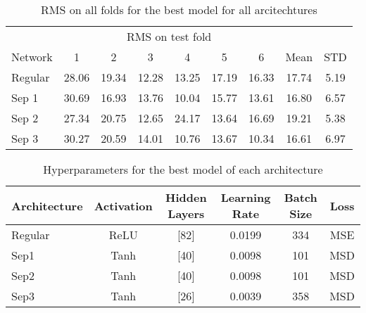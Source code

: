     
\begin{table}[h]
    \centering
    \caption{RMS on all folds for the best model for all arcitechtures}
    \begin{tabular}{lcccccccc}
        \toprule
        & \multicolumn{6}{c}{RMS on test fold} & & \\
        \cmidrule(lr){2-7}
        Network & 1 & 2 & 3 & 4 & 5 & 6 & Mean & STD\\
        \midrule
        Regular & 28.06 & 19.34 & 12.28 & 13.25 & 17.19 & 16.33 & 17.74 & 5.19 \\
        Sep 1 & 30.69 & 16.93 & 13.76 & 10.04 & 15.77 & 13.61 & 16.80 & 6.57 \\
        Sep 2 & 27.34 & 20.75 & 12.65 & 24.17 & 13.64 & 16.69 & 19.21 & 5.38 \\
        Sep 3 & 30.27 & 20.59 & 14.01 & 10.76 & 13.67 & 10.34 & 16.61 & 6.97 \\
        \bottomrule
    \end{tabular}
\end{table}



\begin{table}[h]
    \centering
    \caption{Hyperparameters for the best model of each architecture}
    \begin{tabular}{lccccc}
        \toprule
        Architecture & Activation & Hidden Layers & Learning Rate & Batch Size & Loss \\
        \midrule
        Regular &  ReLU & [82] & 0.0199 & 334 & MSE \\
        Sep1    &  Tanh & [40] & 0.0098 & 101 & MSD \\
        Sep2    &  Tanh & [40] & 0.0098 & 101 & MSD \\
        Sep3    &  Tanh & [26] & 0.0039 & 358 & MSD \\
        \bottomrule
    \end{tabular}
\end{table}





